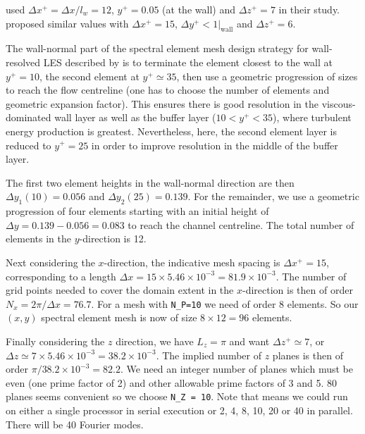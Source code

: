 \documentclass[11pt]{report}
\begin{document}
\citet{kmm87} used $\Delta x^+ =\Delta x / l_w = 12$, $y^+ = 0.05$ (at
the wall) and $\Delta z^+ = 7$ in their study. \citep{pio97} proposed
similar values with $\Delta x^+ = 15$, $\Delta y^+ < 1|_\text{wall}$
and $\Delta z^+ = 6$.

The wall-normal part of the spectral element mesh design strategy for
wall-resolved LES described by \citet{blsc03} is to terminate the
element closest to the wall at $y^+=10$, the second element at
$y^+\simeq35$, then use a geometric progression of sizes to reach the
flow centreline (one has to choose the number of elements and
geometric expansion factor).  This ensures there is good resolution in
the viscous-dominated wall layer as well as the buffer layer
($10<y^+<35$), where turbulent energy production is greatest.
Nevertheless, here, the second element layer is reduced to $y^+ = 25$
in order to improve resolution in the middle of the buffer layer.

The first two element heights in the wall-normal direction are then
$\Delta y_1(10)=0.056$ and $\Delta y_2(25)=0.139$. For the remainder,
we use a geometric progression of four elements starting with an
initial height of $\Delta y = 0.139-0.056=0.083$ to reach the channel
centreline.  The total number of elements in the $y$-direction is 12.

Next considering the $x$-direction, the indicative mesh spacing is
$\Delta x^+=15$, corresponding to a length $\Delta x =
15\times5.46\times10^{-3}=81.9\times10^{-3}$.  The number of grid
points needed to cover the domain extent in the $x$-direction is then
of order $N_x=2\pi/\Delta x=76.7$.  For a mesh with \verb|N_P=10| we
need of order 8 elements.  So our $(x,y)$ spectral element mesh is now
of size $8\times12=96$ elements.

Finally considering the $z$ direction, we have $L_z=\pi$ and want
$\Delta z^+\simeq7$, or $\Delta
z\simeq7\times5.46\times10^{-3}=38.2\times10^{-3}$.  The implied
number of $z$ planes is then of order $\pi/38.2\times10^{-3}=82.2$.
We need an integer number of planes which must be even (one prime
factor of 2) and other allowable prime factors of 3 and 5.  80 planes
seems convenient so we choose \verb|N_Z = 10|.  Note that means we
could run on either a single processor in serial execution or 2, 4, 8,
10, 20 or 40 in parallel.  There will be 40 Fourier modes.
\end{document}
